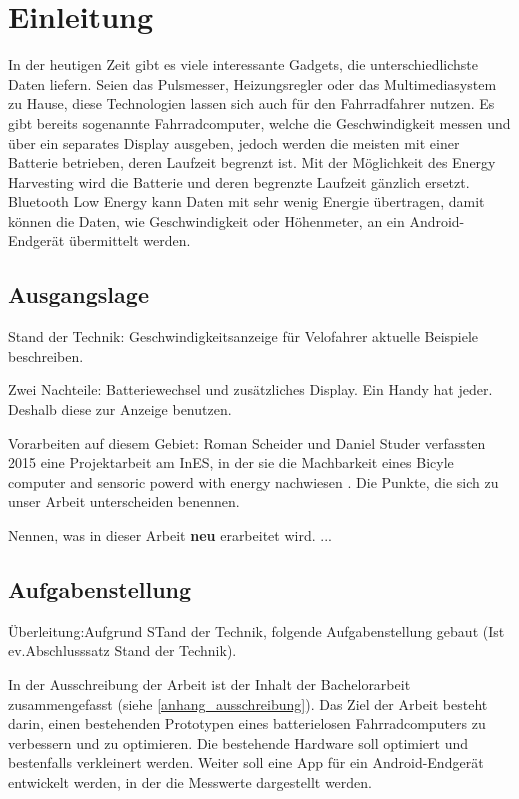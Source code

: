 \chapter{Einleitung}
In der heutigen Zeit gibt es viele interessante Gadgets, die unterschiedlichste Daten liefern. Seien das Pulsmesser, Heizungsregler oder das Multimediasystem zu Hause, diese Technologien lassen sich auch für den Fahrradfahrer nutzen. Es gibt bereits sogenannte Fahrradcomputer, welche die Geschwindigkeit messen und über ein separates Display ausgeben, jedoch werden die meisten mit einer Batterie betrieben, deren Laufzeit begrenzt ist. Mit der Möglichkeit des Energy Harvesting wird die Batterie und deren begrenzte Laufzeit gänzlich ersetzt. Bluetooth Low Energy kann Daten mit sehr wenig Energie übertragen, damit können die Daten, wie Geschwindigkeit oder Höhenmeter, an ein Android-Endgerät übermittelt werden.


\section{Ausgangslage}

Stand der Technik: Geschwindigkeitsanzeige für Velofahrer aktuelle Beispiele beschreiben.

Zwei Nachteile: Batteriewechsel und zusätzliches Display. Ein Handy hat jeder. Deshalb diese zur Anzeige benutzen.



Vorarbeiten auf diesem Gebiet:
Roman Scheider und Daniel Studer verfassten 2015 eine Projektarbeit am InES, in der sie die Machbarkeit eines Bicyle computer and sensoric powerd with energy nachwiesen \cite{PA_bicycle}. 
Die Punkte, die sich zu unser Arbeit unterscheiden benennen.

Nennen, was in dieser Arbeit \textbf{neu} erarbeitet wird.
...



\section{Aufgabenstellung}
Überleitung:Aufgrund STand der Technik, folgende Aufgabenstellung gebaut (Ist ev.Abschlusssatz Stand der Technik).

In der Ausschreibung der Arbeit ist der Inhalt der Bachelorarbeit zusammengefasst (siehe \ref{anhang_ausschreibung}). Das Ziel der Arbeit besteht darin, einen bestehenden Prototypen eines batterielosen Fahrradcomputers zu verbessern und zu optimieren. Die bestehende Hardware soll optimiert und bestenfalls verkleinert werden. Weiter soll eine App für ein Android-Endgerät entwickelt werden, in der die Messwerte dargestellt werden.

